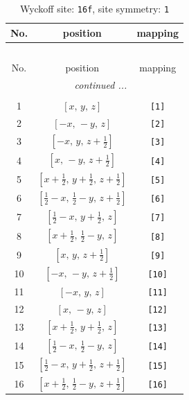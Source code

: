 \documentclass[fleqn,8pt]{jsarticle}
\begin{document}
\begin{longtable}{ccc}
\caption{Wyckoff site: {\tt 16f}, site symmetry: {\tt 1}}
 \\
 \hline \hline
No. & position & mapping \\ \hline \endfirsthead

\multicolumn{2}{l}{\tablename\ \thetable{}} \\
 \hline \hline
No. & position & mapping \\ \hline \endhead

 \hline \hline
\multicolumn{2}{r}{\footnotesize\it continued ...} \\ \endfoot

 \hline \hline
\multicolumn{2}{r}{} \\ \endlastfoot

1 & $\left[ x,\, y,\, z \right]$ & {\tt [1]} \\ \hline
2 & $\left[ - x,\, - y,\, z \right]$ & {\tt [2]} \\ \hline
3 & $\left[ - x,\, y,\, z + \frac{1}{2} \right]$ & {\tt [3]} \\ \hline
4 & $\left[ x,\, - y,\, z + \frac{1}{2} \right]$ & {\tt [4]} \\ \hline
5 & $\left[ x + \frac{1}{2},\, y + \frac{1}{2},\, z + \frac{1}{2} \right]$ & {\tt [5]} \\ \hline
6 & $\left[ \frac{1}{2} - x,\, \frac{1}{2} - y,\, z + \frac{1}{2} \right]$ & {\tt [6]} \\ \hline
7 & $\left[ \frac{1}{2} - x,\, y + \frac{1}{2},\, z \right]$ & {\tt [7]} \\ \hline
8 & $\left[ x + \frac{1}{2},\, \frac{1}{2} - y,\, z \right]$ & {\tt [8]} \\ \hline
9 & $\left[ x,\, y,\, z + \frac{1}{2} \right]$ & {\tt [9]} \\ \hline
10 & $\left[ - x,\, - y,\, z + \frac{1}{2} \right]$ & {\tt [10]} \\ \hline
11 & $\left[ - x,\, y,\, z \right]$ & {\tt [11]} \\ \hline
12 & $\left[ x,\, - y,\, z \right]$ & {\tt [12]} \\ \hline
13 & $\left[ x + \frac{1}{2},\, y + \frac{1}{2},\, z \right]$ & {\tt [13]} \\ \hline
14 & $\left[ \frac{1}{2} - x,\, \frac{1}{2} - y,\, z \right]$ & {\tt [14]} \\ \hline
15 & $\left[ \frac{1}{2} - x,\, y + \frac{1}{2},\, z + \frac{1}{2} \right]$ & {\tt [15]} \\ \hline
16 & $\left[ x + \frac{1}{2},\, \frac{1}{2} - y,\, z + \frac{1}{2} \right]$ & {\tt [16]} \\
\end{longtable}
\end{document}
